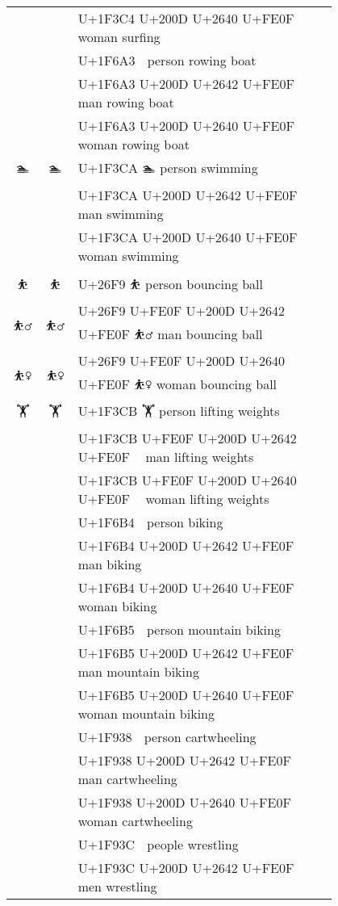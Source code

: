 \documentclass[a4paper,12pt]{article}
\newcommand{\fontA}[1]{{\fontspec[RawFeature={mode=harf,+dist,+ccmp}]{Segoe UI Emoji} #1}}
\newcommand{\fontB}[1]{{\fontspec[RawFeature={mode=harf,+dist,+ccmp}]{Noto Color Emoji} #1}}
\begin{document}
\begin{longtable}[c]{ccp{0.8\linewidth}}
\fontA{🏄‍♀️}&\fontB{🏄‍♀️}&U+1F3C4 U+200D U+2640 U+FE0F 🏄‍♀️ woman surfing\\
\fontA{🚣}&\fontB{🚣}&U+1F6A3 🚣 person rowing boat\\
\fontA{🚣‍♂️}&\fontB{🚣‍♂️}&U+1F6A3 U+200D U+2642 U+FE0F 🚣‍♂️ man rowing boat\\
\fontA{🚣‍♀️}&\fontB{🚣‍♀️}&U+1F6A3 U+200D U+2640 U+FE0F 🚣‍♀️ woman rowing boat\\
\fontA{🏊}&\fontB{🏊}&U+1F3CA 🏊 person swimming\\
\fontA{🏊‍♂️}&\fontB{🏊‍♂️}&U+1F3CA U+200D U+2642 U+FE0F 🏊‍♂️ man swimming\\
\fontA{🏊‍♀️}&\fontB{🏊‍♀️}&U+1F3CA U+200D U+2640 U+FE0F 🏊‍♀️ woman swimming\\
\fontA{⛹}&\fontB{⛹}&U+26F9 ⛹ person bouncing ball\\
\fontA{⛹️‍♂️}&\fontB{⛹️‍♂️}&U+26F9 U+FE0F U+200D U+2642 U+FE0F ⛹️‍♂️ man bouncing ball\\
\fontA{⛹️‍♀️}&\fontB{⛹️‍♀️}&U+26F9 U+FE0F U+200D U+2640 U+FE0F ⛹️‍♀️ woman bouncing ball\\
\fontA{🏋}&\fontB{🏋}&U+1F3CB 🏋 person lifting weights\\
\fontA{🏋️‍♂️}&\fontB{🏋️‍♂️}&U+1F3CB U+FE0F U+200D U+2642 U+FE0F 🏋️‍♂️ man lifting weights\\
\fontA{🏋️‍♀️}&\fontB{🏋️‍♀️}&U+1F3CB U+FE0F U+200D U+2640 U+FE0F 🏋️‍♀️ woman lifting weights\\
\fontA{🚴}&\fontB{🚴}&U+1F6B4 🚴 person biking\\
\fontA{🚴‍♂️}&\fontB{🚴‍♂️}&U+1F6B4 U+200D U+2642 U+FE0F 🚴‍♂️ man biking\\
\fontA{🚴‍♀️}&\fontB{🚴‍♀️}&U+1F6B4 U+200D U+2640 U+FE0F 🚴‍♀️ woman biking\\
\fontA{🚵}&\fontB{🚵}&U+1F6B5 🚵 person mountain biking\\
\fontA{🚵‍♂️}&\fontB{🚵‍♂️}&U+1F6B5 U+200D U+2642 U+FE0F 🚵‍♂️ man mountain biking\\
\fontA{🚵‍♀️}&\fontB{🚵‍♀️}&U+1F6B5 U+200D U+2640 U+FE0F 🚵‍♀️ woman mountain biking\\
\fontA{🤸}&\fontB{🤸}&U+1F938 🤸 person cartwheeling\\
\fontA{🤸‍♂️}&\fontB{🤸‍♂️}&U+1F938 U+200D U+2642 U+FE0F 🤸‍♂️ man cartwheeling\\
\fontA{🤸‍♀️}&\fontB{🤸‍♀️}&U+1F938 U+200D U+2640 U+FE0F 🤸‍♀️ woman cartwheeling\\
\fontA{🤼}&\fontB{🤼}&U+1F93C 🤼 people wrestling\\
\fontA{🤼‍♂️}&\fontB{🤼‍♂️}&U+1F93C U+200D U+2642 U+FE0F 🤼‍♂️ men wrestling\\

\end{longtable}
\end{document}
